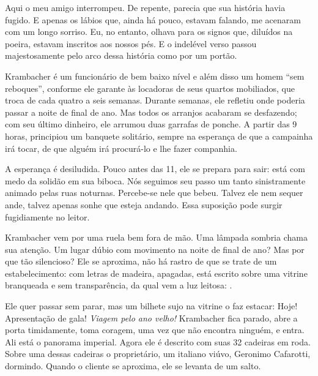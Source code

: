 Aqui o meu amigo interrompeu. De repente, parecia que sua história havia
fugido. E apenas os lábios que, ainda há pouco, estavam falando, me
acenaram com um longo sorriso. Eu, no entanto, olhava para os signos
que, diluídos na poeira, estavam inscritos aos nossos pés. E o indelével
verso passou majestosamente pelo arco dessa história como por um portão.


Krambacher é um funcionário de bem baixo nível e além disso um homem
``sem reboques'', conforme ele garante às locadoras de seus quartos
mobiliados, que troca de cada quatro a seis semanas. Durante semanas,
ele refletiu onde poderia passar a noite de final de ano. Mas todos os
arranjos acabaram se desfazendo; com seu último dinheiro, ele arrumou
duas garrafas de ponche. A partir das 9 horas, principiou um banquete
solitário, sempre na esperança de que a campainha irá tocar, de que
alguém irá procurá-lo e lhe fazer companhia.

A esperança é desiludida. Pouco antes das 11, ele se prepara para sair:
está com medo da solidão em sua biboca. Nós seguimos seu passo um tanto
sinistramente animado pelas ruas noturnas. Percebe-se nele que bebeu.
Talvez ele nem sequer ande, talvez apenas sonhe que esteja andando. Essa
suposição pode surgir fugidiamente no leitor.

Krambacher vem por uma ruela bem fora de mão. Uma lâmpada sombria chama
sua atenção. Um lugar dúbio com movimento na noite de final de ano? Mas
por que tão silencioso? Ele se aproxima, não há rastro de que se trate
de um estabelecimento: com letras de madeira, apagadas, está escrito
sobre uma vitrine branqueada e sem transparência, da qual vem a luz
leitosa: .

Ele quer passar sem parar, mas um bilhete sujo na vitrine o faz estacar:
Hoje! Apresentação de gala! \emph{Viagem pelo ano velho!} Krambacher
fica parado, abre a porta timidamente, toma coragem, uma vez que não
encontra ninguém, e entra. Ali está o panorama imperial. Agora ele é
descrito com suas 32 cadeiras em roda. Sobre uma dessas cadeiras o
proprietário, um italiano viúvo, Geronimo Cafarotti, dormindo. Quando o
cliente se aproxima, ele se levanta de um salto.

